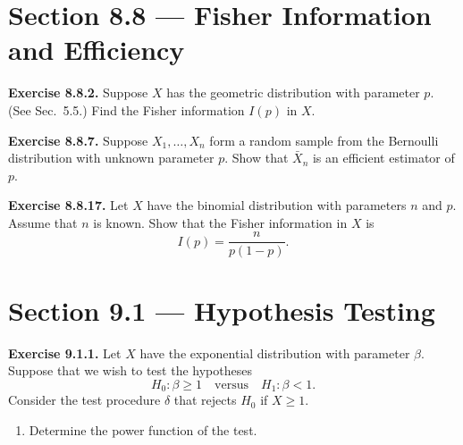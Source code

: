 \documentclass[11pt]{article}
\begin{document}
\section*{Section 8.8 --- Fisher Information and Efficiency}

\textbf{Exercise 8.8.2.} Suppose $X$ has the geometric distribution with parameter $p$. (See Sec.~5.5.) Find the Fisher information $I(p)$ in $X$.

\vspace{0.5em}

\textbf{Exercise 8.8.7.} Suppose $X_1, \dots, X_n$ form a random sample from the Bernoulli distribution with unknown parameter $p$. Show that $\bar{X}_n$ is an efficient estimator of $p$.

\vspace{0.5em}

\textbf{Exercise 8.8.17.} Let $X$ have the binomial distribution with parameters $n$ and $p$. Assume that $n$ is known. Show that the Fisher information in $X$ is
\[
I(p) = \frac{n}{p(1 - p)}.
\]

\section*{Section 9.1 --- Hypothesis Testing}

\textbf{Exercise 9.1.1.} Let $X$ have the exponential distribution with parameter $\beta$. Suppose that we wish to test the hypotheses
\[
H_0 : \beta \geq 1 \quad \text{versus} \quad H_1 : \beta < 1.
\]
Consider the test procedure $\delta$ that rejects $H_0$ if $X \geq 1$.
\begin{enumerate}
    \item[(a)] Determine the power function of the test.
\end{enumerate}
\end{document}
